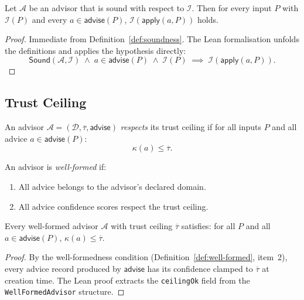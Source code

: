 \documentclass[11pt]{article}
\newcommand{\Adv}{\mathcal{A}}
\newcommand{\Domain}{\mathcal{D}}
\newcommand{\Trust}{\tau}
\newcommand{\TrustCeil}{\overline{\Trust}}
\newcommand{\Conf}{\kappa}
\newcommand{\Sound}{\mathsf{Sound}}
\newcommand{\Inv}{\mathcal{I}}
\newcommand{\AdvisorOp}{\mathsf{advise}}
\begin{document}
\begin{theorem}\label{thm:soundness}
Let $\Adv$ be an advisor that is sound with respect to $\Inv$.  Then
for every input $P$ with $\Inv(P)$ and every $a \in \AdvisorOp(P)$,
$\Inv(\mathsf{apply}(a, P))$ holds.
\end{theorem}

\begin{proof}
Immediate from Definition~\ref{def:soundness}.  The Lean formalisation
unfolds the definitions and applies the hypothesis directly:
\[
  \Sound(\Adv, \Inv) \;\wedge\; a \in \AdvisorOp(P) \;\wedge\; \Inv(P)
  \;\implies\; \Inv(\mathsf{apply}(a, P)).
\]
\end{proof}

\subsection{Trust Ceiling}\label{sec:trust-ceiling}

\begin{definition}\label{def:trust-ceiling}
An advisor $\Adv = (\Domain, \TrustCeil, \AdvisorOp)$ \emph{respects}
its trust ceiling if for all inputs $P$ and all advice $a \in
\AdvisorOp(P)$:
\[
  \Conf(a) \leq \TrustCeil.
\]
\end{definition}

\begin{definition}\label{def:well-formed}
An advisor is \emph{well-formed} if:
\begin{enumerate}
  \item All advice belongs to the advisor's declared domain.
  \item All advice confidence scores respect the trust ceiling.
\end{enumerate}
\end{definition}

\begin{theorem}\label{thm:trust-ceiling}
Every well-formed advisor $\Adv$ with trust ceiling $\TrustCeil$
satisfies: for all $P$ and all $a \in \AdvisorOp(P)$,
$\Conf(a) \leq \TrustCeil$.
\end{theorem}

\begin{proof}
By the well-formedness condition (Definition~\ref{def:well-formed},
item~2), every advice record produced by $\AdvisorOp$ has its
confidence clamped to $\TrustCeil$ at creation time.  The Lean proof
extracts the \texttt{ceilingOk} field from the \texttt{WellFormedAdvisor}
structure.
\end{proof}
\end{document}
